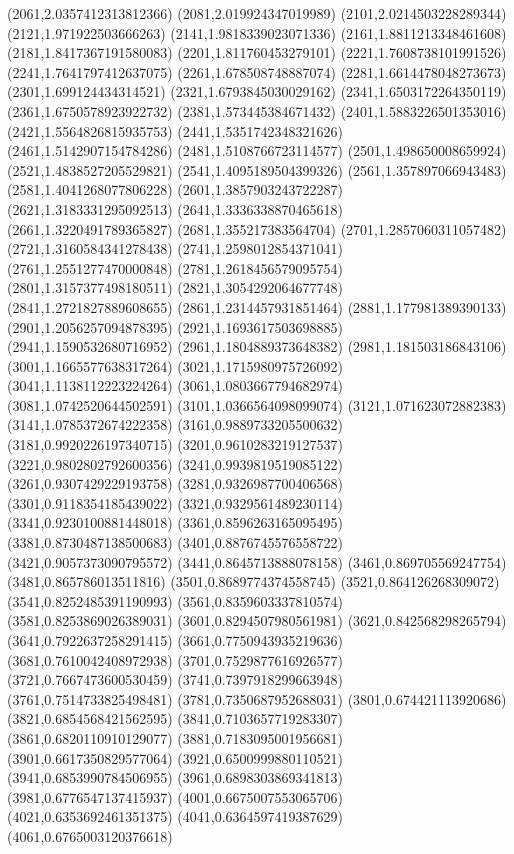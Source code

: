 {(2061,2.0357412313812366)
(2081,2.019924347019989)
(2101,2.0214503228289344)
(2121,1.971922503666263)
(2141,1.9818339023071336)
(2161,1.8811213348461608)
(2181,1.8417367191580083)
(2201,1.811760453279101)
(2221,1.7608738101991526)
(2241,1.7641797412637075)
(2261,1.678508748887074)
(2281,1.6614478048273673)
(2301,1.699124434314521)
(2321,1.6793845030029162)
(2341,1.6503172264350119)
(2361,1.6750578923922732)
(2381,1.573445384671432)
(2401,1.5883226501353016)
(2421,1.5564826815935753)
(2441,1.5351742348321626)
(2461,1.5142907154784286)
(2481,1.5108766723114577)
(2501,1.498650008659924)
(2521,1.4838527205529821)
(2541,1.4095189504399326)
(2561,1.357897066943483)
(2581,1.4041268077806228)
(2601,1.3857903243722287)
(2621,1.3183331295092513)
(2641,1.3336338870465618)
(2661,1.3220491789365827)
(2681,1.355217383564704)
(2701,1.2857060311057482)
(2721,1.3160584341278438)
(2741,1.2598012854371041)
(2761,1.2551277470000848)
(2781,1.2618456579095754)
(2801,1.3157377498180511)
(2821,1.3054292064677748)
(2841,1.2721827889608655)
(2861,1.2314457931851464)
(2881,1.177981389390133)
(2901,1.2056257094878395)
(2921,1.1693617503698885)
(2941,1.1590532680716952)
(2961,1.1804889373648382)
(2981,1.181503186843106)
(3001,1.1665577638317264)
(3021,1.1715980975726092)
(3041,1.1138112223224264)
(3061,1.0803667794682974)
(3081,1.0742520644502591)
(3101,1.0366564098099074)
(3121,1.071623072882383)
(3141,1.0785372674222358)
(3161,0.9889733205500632)
(3181,0.9920226197340715)
(3201,0.9610283219127537)
(3221,0.9802802792600356)
(3241,0.9939819519085122)
(3261,0.9307429229193758)
(3281,0.9326987700406568)
(3301,0.9118354185439022)
(3321,0.9329561489230114)
(3341,0.9230100881448018)
(3361,0.8596263165095495)
(3381,0.8730487138500683)
(3401,0.8876745576558722)
(3421,0.9057373090795572)
(3441,0.8645713888078158)
(3461,0.869705569247754)
(3481,0.865786013511816)
(3501,0.8689774374558745)
(3521,0.864126268309072)
(3541,0.8252485391190993)
(3561,0.8359603337810574)
(3581,0.8253869026389031)
(3601,0.8294507980561981)
(3621,0.842568298265794)
(3641,0.7922637258291415)
(3661,0.7750943935219636)
(3681,0.7610042408972938)
(3701,0.7529877616926577)
(3721,0.7667473600530459)
(3741,0.7397918299663948)
(3761,0.7514733825498481)
(3781,0.7350687952688031)
(3801,0.674421113920686)
(3821,0.6854568421562595)
(3841,0.7103657719283307)
(3861,0.6820110910129077)
(3881,0.7183095001956681)
(3901,0.6617350829577064)
(3921,0.6500999880110521)
(3941,0.6853990784506955)
(3961,0.6898303869341813)
(3981,0.6776547137415937)
(4001,0.6675007553065706)
(4021,0.6353692461351375)
(4041,0.6364597419387629)
(4061,0.6765003120376618)
}
